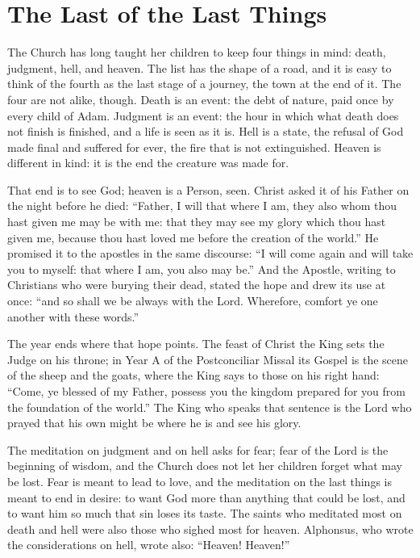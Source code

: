 \section{The Last of the Last Things}

The Church has long taught her children to keep four things in mind: death, judgment, hell, and heaven. The list has the shape of a road, and it is easy to think of the fourth as the last stage of a journey, the town at the end of it. The four are not alike, though. Death is an event: the debt of nature, paid once by every child of Adam. Judgment is an event: the hour in which what death does not finish is finished, and a life is seen as it is. Hell is a state, the refusal of God made final and suffered for ever, the fire that is not extinguished. Heaven is different in kind: it is the end the creature was made for.

That end is to see God; heaven is a Person, seen. Christ asked it of his Father on the night before he died: ``Father, I will that where I am, they also whom thou hast given me may be with me: that they may see my glory which thou hast given me, because thou hast loved me before the creation of the world.'' He promised it to the apostles in the same discourse: ``I will come again and will take you to myself: that where I am, you also may be.'' And the Apostle, writing to Christians who were burying their dead, stated the hope and drew its use at once: ``and so shall we be always with the Lord. Wherefore, comfort ye one another with these words.''

The year ends where that hope points. The feast of Christ the King sets the Judge on his throne; in Year A of the Postconciliar Missal its Gospel is the scene of the sheep and the goats, where the King says to those on his right hand: ``Come, ye blessed of my Father, possess you the kingdom prepared for you from the foundation of the world.'' The King who speaks that sentence is the Lord who prayed that his own might be where he is and see his glory.

The meditation on judgment and on hell asks for fear; fear of the Lord is the beginning of wisdom, and the Church does not let her children forget what may be lost. Fear is meant to lead to love, and the meditation on the last things is meant to end in desire: to want God more than anything that could be lost, and to want him so much that sin loses its taste. The saints who meditated most on death and hell were also those who sighed most for heaven. Alphonsus, who wrote the considerations on hell, wrote also: ``Heaven! Heaven!''

